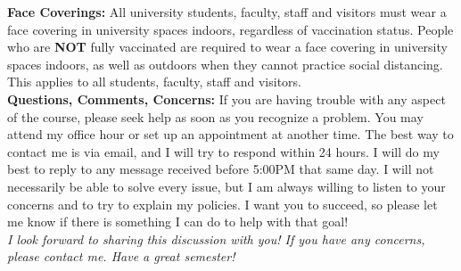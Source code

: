 \documentclass[12pt]{article}
\begin{document}
\textbf{Face Coverings:} All university students, faculty, staff and visitors must wear a face covering in university spaces indoors, regardless of vaccination status. People who are \textbf{NOT} fully vaccinated are required to wear a face covering in university spaces indoors, as well as outdoors when they cannot practice social distancing. This applies to all students, faculty, staff and visitors. 	\\

\noindent \textbf{Questions, Comments, Concerns:} If you are having trouble with any aspect of the course, please seek help as soon as you recognize a problem. You may attend my office hour or set up an appointment at another time. The best way to contact me is via email, and I will try to respond within 24 hours. I will do my best to reply to any message received before 5:00PM that same day. I will not necessarily be able to solve every issue, but I am always willing to listen to your concerns and to try to explain my policies. I want you to succeed, so please let me know if there is something I can do to help with that goal! \\

\emph{I look forward to sharing this discussion with you! If you have any concerns, please contact me.  Have a great semester!}
\end{document}
